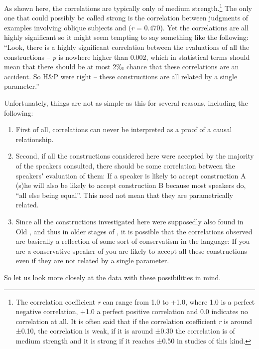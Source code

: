 \documentclass[output=paper]{LSP/langsci}
\begin{document}
As shown here, the correlations are typically only of medium strength.\footnote{The correlation coefficient \textit{r} can range from {\textminus}1.0 to +1.0, where {\textminus}1.0 is a perfect negative correlation, +1.0 a perfect positive correlation and 0.0 indicates no correlation at all. It is often said that if the correlation coefficient \textit{r} is around ±0.10, the correlation is weak, if it is around ±0.30 the correlation is of medium strength and it is strong if it reaches ±0.50 in studies of this kind.} The only one that could possibly be called strong is the correlation between judgments of examples involving oblique subjects and  (\textit{r} = 0.470). Yet the correlations are all highly significant so it might seem tempting to say something like the following: “Look, there is a highly significant correlation between the evaluations of all the constructions -- \textit{p} is nowhere higher than 0.002, which in statistical terms should mean that there should be at most 2‰ chance that these correlations are an accident. So H{\&}P were right -- these constructions are all related by a single parameter.”

Unfortunately, things are not as simple  as this for several reasons, including the following:

\begin{enumerate}
	\item First of all, correlations can never be interpreted as a proof of a causal relationship.
	\item  Second, if all the constructions considered here were accepted by the majority of the speakers consulted, there should be some correlation between the speakersʼ evaluation of them: If a speaker is likely to accept construction A (s)he will also be likely to accept construction B because most speakers do, “all else being equal”. This need not mean that they are parametrically related.
	\item Since all the constructions investigated here were supposedly also found in Old , and thus in older stages of , it is possible that the correlations observed are basically a reflection of some sort of conservatism in the language: If you are a conservative speaker of  you are likely to accept all these constructions even if they are not related by a single parameter.
\end{enumerate}

So let us look more closely at the data with these possibilities in mind.
\end{document}
